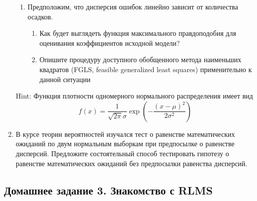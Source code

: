 \documentclass[12pt, a4paper]{article}\usepackage[]{graphicx}\usepackage[]{color}
\begin{document}
\begin{enumerate}
\begin{enumerate}
\item Предположим, что дисперсия ошибок линейно зависит от количества осадков.
\begin{enumerate}
\item Как будет выглядеть функция максимального правдоподобия для оценивания коэффициентов исходной модели?
\item Опишите процедуру доступного обобщенного метода наименьших квадратов (FGLS, feasible generalized least squares) применительно к данной ситуации
\end{enumerate}
\end{enumerate}
Hint: Функция плотности одномерного нормального распределения имеет вид
\[
f(x)=\frac{1}{\sqrt{2\pi}\sigma}\exp\left(-\frac{(x-\mu)^2}{2\sigma^2}  \right)
\]


\item В курсе теории вероятностей изучался тест о равенстве математических ожиданий по двум нормальным выборкам при предпосылке о равенстве дисперсий. Предложите состоятельный способ тестировать гипотезу о равенстве математических ожиданий без предпосылки равенства дисперсий.


\end{enumerate}

\subsection{Домашнее задание 3. Знакомство с RLMS}
\end{document}
